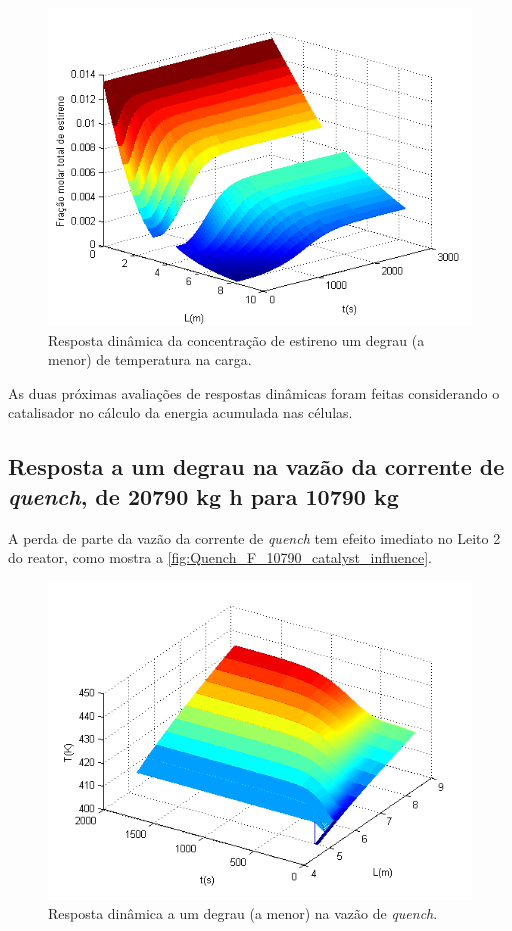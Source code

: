 \begin{figure}[htb]
\centering
\includegraphics[scale=0.8]{images/Chap4/Feed_T_300K_catalyst_influence_styrene.png}
\caption{Resposta dinâmica da concentração de estireno um degrau (a menor) de
temperatura na carga.}
\label{fig:Feed_T_300K_catalyst_influence_styrene}
\end{figure}

As duas próximas avaliações de respostas dinâmicas foram feitas considerando o
catalisador no cálculo da energia acumulada nas células.

\subsection{Resposta a um degrau na vazão da corrente de \emph{quench}, de 20790
kg h para 10790 kg} \label{sec:respostaaumdegrauvazao1}

A perda de parte da vazão da corrente de \emph{quench} tem efeito imediato no
Leito 2 do reator, como mostra a \autoref{fig:Quench_F_10790_catalyst_influence}.

\begin{figure}[htb]
\centering
\includegraphics[scale=0.8]{images/Chap4/Quench_F_10790_catalyst_influence.png}
\caption{Resposta dinâmica a um degrau (a menor) na vazão de \emph{quench}.}
\label{fig:Quench_F_10790_catalyst_influence}
\end{figure}

